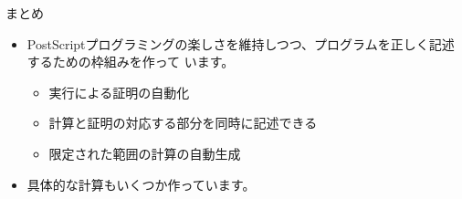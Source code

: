 \documentclass[cjk, 12pt]{beamer}
\begin{document}
\begin{frame}{まとめ}

 \begin{itemize}
  \item PostScriptプログラミングの楽しさを維持しつつ、プログラムを正しく記述するための枠組みを作って
	います。
	\begin{itemize}
	 \item 実行による証明の自動化
	 \item 計算と証明の対応する部分を同時に記述できる
	 \item 限定された範囲の計算の自動生成
	\end{itemize}
  \item 具体的な計算もいくつか作っています。
 \end{itemize}

\end{frame}
\end{document}
